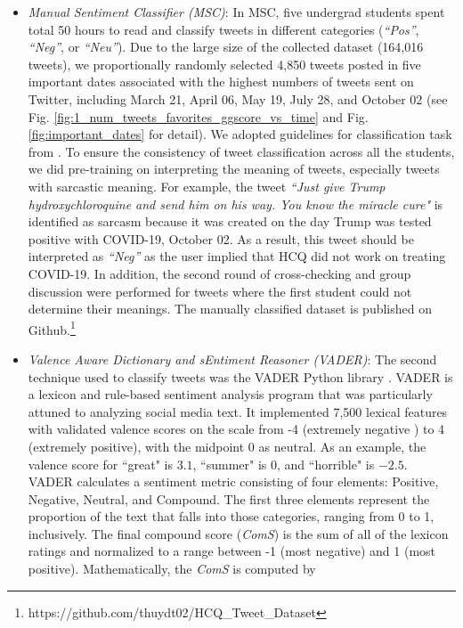\documentclass[conference]{IEEEtran}
\begin{document}
\begin{itemize}
		\begin{itemize}
			\item {\it Manual Sentiment Classifier (MSC)}: In MSC, five undergrad students spent total 50 hours to read and classify tweets in different categories ({\it ``Pos''}, {\it ``Neg''}, or {\it ``Neu''}). Due to the large size of the collected dataset (164,016 tweets), we proportionally randomly selected 4,850 tweets posted in five important dates associated with the highest numbers of tweets sent on Twitter, including March 21, April 06, May 19, July 28, and October 02 (see Fig. \ref{fig:1_num_tweets_favorites_ggscore_vs_time} and Fig. \ref{fig:important_dates}  for detail). We adopted guidelines for classification task from \cite{b4}. 
			To ensure the consistency of tweet classification across all the students, we did pre-training on interpreting the meaning of tweets, especially tweets with sarcastic meaning. For example, the tweet \textit{``Just give Trump hydroxychloroquine and send him on his way. You know the miracle cure"} is identified as sarcasm because it was created on the day Trump was tested positive with COVID-19, October 02. As a result, this tweet should be interpreted as \textit{``Neg''} as the user implied that HCQ did not work on treating COVID-19. In addition, the second round of cross-checking and group discussion were performed for tweets where the first student could not determine their meanings. The manually classified dataset is published on Github.\footnote{https://github.com/thuydt02/HCQ\_Tweet\_Dataset}
			\item {\it Valence Aware Dictionary and sEntiment Reasoner (VADER)}: The second technique used to classify tweets was the VADER Python library \cite{b12}. VADER is a lexicon and rule-based sentiment analysis program that was particularly attuned to analyzing social media text. It implemented 7,500 lexical features with validated valence scores on the scale from -4 (extremely negative ) to 4 (extremely positive), with the midpoint 0 as neutral. As an example, the valence score for ``great" is $3.1$, ``summer" is $0$, and ``horrible" is $-2.5$. VADER calculates a sentiment metric consisting of four elements: Positive, Negative, Neutral, and Compound. The first three elements represent the proportion of the text that falls into those categories, ranging from 0 to 1, inclusively. The final compound score (\textit{ComS}) is the sum of all of the lexicon ratings and normalized to a range between -1 (most negative) and 1 (most positive). Mathematically, the \textit{ComS} is computed by\\

\end{itemize}
\end{itemize}
\end{document}
